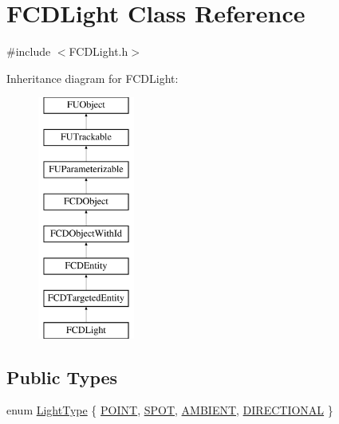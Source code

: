 \hypertarget{classFCDLight}{
\section{FCDLight Class Reference}
\label{classFCDLight}
}


{\ttfamily \#include $<$FCDLight.h$>$}

Inheritance diagram for FCDLight:\begin{figure}[H]
\begin{center}
\leavevmode
\includegraphics[height=8.000000cm]{classFCDLight}
\end{center}
\end{figure}
\subsection*{Public Types}
\begin{DoxyCompactItemize}
\item 
enum \hyperlink{classFCDLight_a358eac688b4a74aa90531e5206e92e60}{LightType} \{ \hyperlink{classFCDLight_a358eac688b4a74aa90531e5206e92e60acdd1f5feac88cf971d9edad4126243c5}{POINT}, 
\hyperlink{classFCDLight_a358eac688b4a74aa90531e5206e92e60aaca948f926e7b39611a4f5a4886db8cd}{SPOT}, 
\hyperlink{classFCDLight_a358eac688b4a74aa90531e5206e92e60abf76b195d4f9db1832f491c0b6223c5e}{AMBIENT}, 
\hyperlink{classFCDLight_a358eac688b4a74aa90531e5206e92e60a07c34b01d651ace906e59ff728a8112d}{DIRECTIONAL}
 \}
\end{DoxyCompactItemize}
